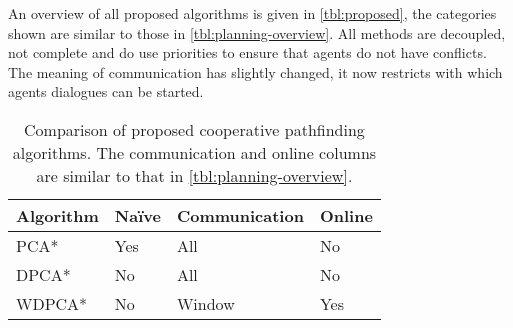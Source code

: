 An overview of all proposed algorithms is given in \autoref{tbl:proposed}, the
categories shown are similar to those in \autoref{tbl:planning-overview}. All
methods are decoupled, not complete and do use priorities to ensure that agents
do not have conflicts. The meaning of communication has slightly changed, it
now restricts with which agents dialogues can be started.

\begin{table}
    \centering
    \caption{Comparison of proposed cooperative pathfinding algorithms. The
    communication and online columns are similar to that in
    \autoref{tbl:planning-overview}.}
    \label{tbl:proposed}
    \begin{tabular}{l|l|l|l}
        Algorithm & Na\"ive & Communication & Online \\ \hline
        PCA*   & Yes & All & No \\
        DPCA*  & No  & All & No \\
        WDPCA* & No  & Window & Yes \\
    \end{tabular}
\end{table}